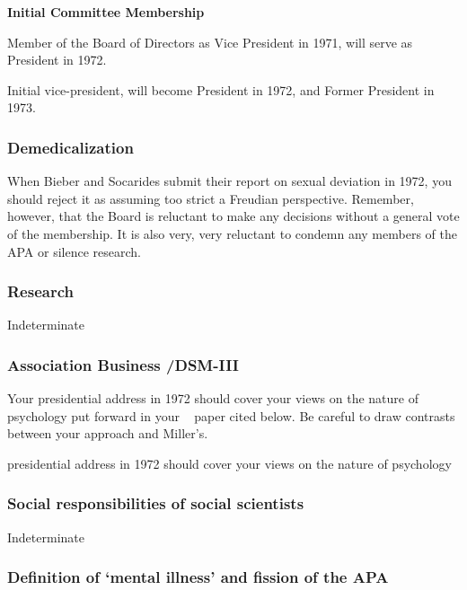 \begin{refsection}
\textbf{Initial Committee Membership}
\begin{service}[Bandura]\label{service:bandura}
Member of the Board of Directors as Vice President in 1971, will serve as President in 1972.
\end{service}

Initial vice-president, will become President in 1972, and Former President in 1973.

\subsubsection{Demedicalization}
\label{demedicalization}

When Bieber and Socarides submit their report on sexual deviation in 1972, you should reject it as assuming too strict a Freudian perspective. Remember, however, that the Board is reluctant to make any decisions without a general vote of the membership. It is also very, very reluctant to condemn any members of the APA or silence research.

\subsubsection{Research}
\label{research}

Indeterminate

\subsubsection{Association Business \slash  DSM-III}
\label{associationbusinessdsm-iii}

Your presidential address in 1972 should cover your views on the nature of psychology put forward in your ~\citep{Bandura:1974kd} paper cited below. Be careful to draw contrasts between your approach and Miller's.

\begin{writingtask}[Bandura]\label{writingtask:bandura}
presidential address in 1972 should cover your views on the nature of psychology
\end{writingtask}

\subsubsection{Social responsibilities of social scientists}
\label{socialresponsibilitiesofsocialscientists}

Indeterminate

\subsubsection{Definition of ‘mental illness’ and fission of the APA}
\label{definitionof‘mentalillness’andfissionoftheapa}


\end{refsection}
